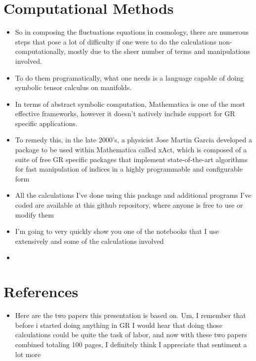 \documentclass[10pt,letterpaper]{article}
\numberwithin{equation}{section}
\begin{document}
\section{Computational Methods}
\begin{itemize}
	\item So in composing the fluctuations equations in cosmology, there are numerous steps that pose a lot of difficulty if one were to do the calculations non-computationally, mostly due to the sheer number of terms and manipulations involved. 
	\item To do them programatically, what one needs is a language capable of doing symbolic tensor calculus on manifolds. 
	\item In terms of abstract symbolic computation, Mathematica is one of the most effective frameworks, however it doesn't natively include support for GR specific applications.
	\item To remedy this, in the late 2000's, a physicist Jose Martin Garcia developed a package to be used within Mathematica called xAct, which is composed of a suite of free GR specific packages that implement state-of-the-art algorithms for fast manipulation of indices in a highly programmable and configurable form
	\item All the calculations I've done using this package and additional programs I've coded are available at this github repository, where anyone is free to use or modify them
	\item I'm going to very quickly show you one of the notebooks that I use extensively and some of the calculations involved
	\item 
\end{itemize}


\section{References}
\begin{itemize}
	\item Here are the two papers this presentation is based on. Um, I remember that before i started doing anything in GR I would hear that doing those calculations could be quite the task of labor, and now with these two papers combined totaling 100 pages, I definitely think I appreciate that sentiment a lot more
\end{itemize}
\end{document}

